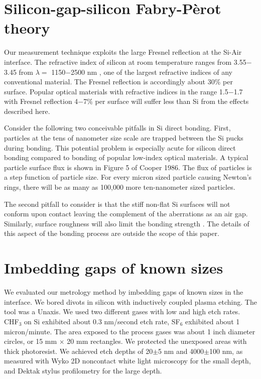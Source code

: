 \documentclass[osajnl,preprint,showpacs,superscriptaddress,12pt]{revtex4-1} %
\begin{document}
\section{Silicon-gap-silicon Fabry-P\`{e}rot theory}


Our measurement technique exploits the large Fresnel reflection \cite{2001opt4.book.....H} at the Si-Air interface.  The refractive index of silicon at room temperature ranges from 3.55$-$3.45 from $\lambda = $ 1150$-$2500 nm \cite{2006SPIE.6273E..77F}, one of the largest refractive indices of any conventional material.  The Fresnel reflection is accordingly about 30\% per surface.  Popular optical materials with refractive indices in the range 1.5$-$1.7 with Fresnel reflection 4$-$7\% per surface will suffer less than Si from the effects described here.


Consider the following two conceivable pitfalls in Si direct bonding.  First, particles at the tens of nanometer size scale are trapped between the Si pucks during bonding.  This potential problem is especially acute for silicon direct bonding compared to bonding of popular low-index optical materials.  A typical particle surface flux is shown in Figure 5 of Cooper 1986\cite{Cooper_1986}.  The flux of particles is a step function of particle size.  For every micron sized particle causing Newton's rings, there will be as many as 100,000 more ten-nanometer sized particles.


The second pitfall to consider is that the stiff non-flat Si surfaces will not conform upon contact leaving the complement of the aberrations as an air gap. Similarly, surface roughness will also limit the bonding strength  \cite{JJAP.37.4197,2001JOptA...3...85G}.  The details of this aspect of the bonding process are outside the scope of this paper.  

\section{Imbedding gaps of known sizes}
We evaluated our metrology method by imbedding gaps of known sizes in the interface.  We bored divots in silicon with inductively coupled plasma etching.  The tool was a Unaxis.  We used two different gases with low and high etch rates.  CHF$_3$ on Si exhibited about 0.3 nm/second etch rate, SF$_6$ exhibited about 1 micron/minute.  The area exposed to the process gases was about 1 inch diameter circles, or 15 mm $\times$ 20 mm rectangles.  We protected the unexposed areas with thick photoresist.  We achieved etch depths of 20$\pm$5 nm and 4000$\pm$100 nm, as measured with Wyko 2D noncontact white light microscopy for the small depth, and Dektak stylus profilometry for the large depth.  
\end{document}
